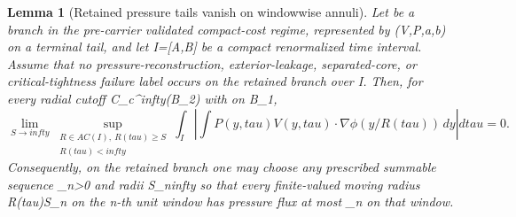 \documentclass[11pt]{amsart}
\def\({}%
\def\){}%
\def\tau{tau}%
\def\infty{infty}%
\theoremstyle{plain}
\newtheorem{lemma}[lemma]{Lemma}
\theoremstyle{definition}
\theoremstyle{remark}
\begin{document}
\begin{lemma}[Retained pressure tails vanish on windowwise annuli]
\label{paper7:lem:retained-pressure-tail-windowwise}
Let \(\omega\) be a branch in the pre-carrier validated compact-cost regime,
represented by \((V,P,a,b)\) on a terminal tail, and let \(I=[A,B]\) be a
compact renormalized time interval.  Assume that no pressure-reconstruction,
exterior-leakage, separated-core, or critical-tightness failure label occurs on
the retained branch over \(I\).  Then, for every radial cutoff
\(\phi\in C_c^\infty(B_2)\) with \(\) on \(B_1\),
\[
  \lim_{S\to\infty}
  \sup_{\substack{R\in AC(I),\ R(\tau)\ge S\\ R(\tau)<\infty}}
  \int_I
  \left|
  \int P(y,\tau)V(y,\tau)\cdot\nabla\phi(y/R(\tau))\,dy
  \right|d\tau
  =0 .
\]
Consequently, on the retained branch one may choose any prescribed summable
sequence \(\varepsilon_n>0\) and radii \(S_n\to\infty\) so that every
finite-valued moving radius \(R(\tau)\ge S_n\) on the \(n\)-th unit window has
pressure flux at most \(\varepsilon_n\) on that window.
\end{lemma}
\end{document}
